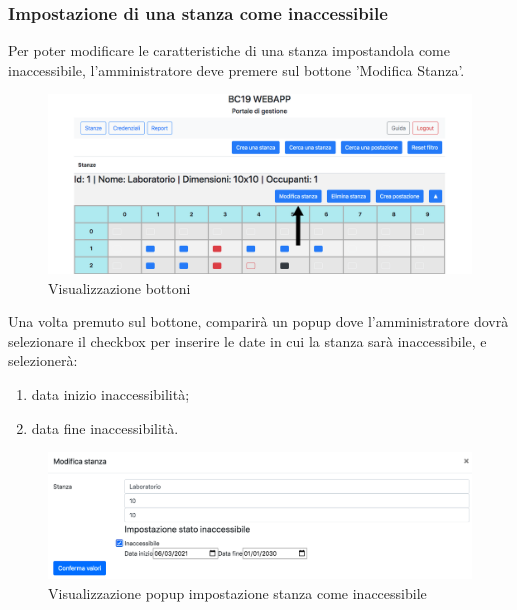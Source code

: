 \subsubsection{Impostazione di una stanza come inaccessibile}
Per poter modificare le caratteristiche di una stanza impostandola come inaccessibile, l'amministratore deve premere sul bottone 'Modifica Stanza'.
\begin{figure}[H]
	\centering
	\includegraphics[width=15cm]{res/images/bottoneEditRoom.png}
	\caption{Visualizzazione bottoni}
\end{figure}
Una volta premuto sul bottone, comparirà un popup dove l'amministratore dovrà selezionare il checkbox per inserire le date in cui la stanza sarà inaccessibile, e selezionerà:
\begin{enumerate}
	\item data inizio inaccessibilità;
	\item data fine inaccessibilità.
\end{enumerate}
\begin{figure}[H]
	\centering
	\includegraphics[width=15cm]{res/images/roomInaccessibile.png}
	\caption{Visualizzazione popup impostazione stanza come inaccessibile}
\end{figure}

